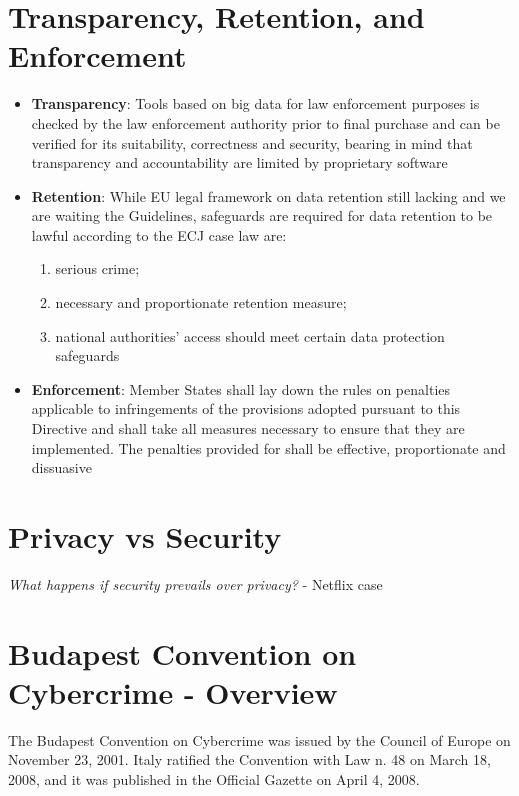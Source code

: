 \section{Transparency, Retention, and Enforcement}

\begin{itemize}[itemsep=0pt]
    \item \textbf{Transparency}: Tools based on big data for law enforcement purposes is checked by the law enforcement authority prior to final purchase and can be verified for its suitability, correctness and security, bearing in mind that transparency and accountability are limited by proprietary software
    \item \textbf{Retention}: While EU legal framework on data retention still lacking and we are waiting the Guidelines, safeguards are required for data retention to be lawful according to the ECJ case law are: 
    \begin{enumerate}[itemsep=0pt, label=\roman*.]
        \item serious crime;
        \item necessary and proportionate retention measure;
        \item national authorities’ access should meet certain data protection safeguards
    \end{enumerate}
    
    \item \textbf{Enforcement}: Member States shall lay down the rules on penalties applicable to infringements of the provisions adopted pursuant to this Directive and shall take all measures necessary to ensure that they are implemented. The penalties provided for shall be effective, proportionate and dissuasive
\end{itemize}

\section{Privacy vs Security}

\textit{What happens if security prevails over privacy?} - Netflix case

\section{Budapest Convention on Cybercrime - Overview}

The Budapest Convention on Cybercrime was issued by the Council of Europe on November 23, 2001.  
Italy ratified the Convention with Law n. 48 on March 18, 2008, and it was published in the Official Gazette on April 4, 2008.